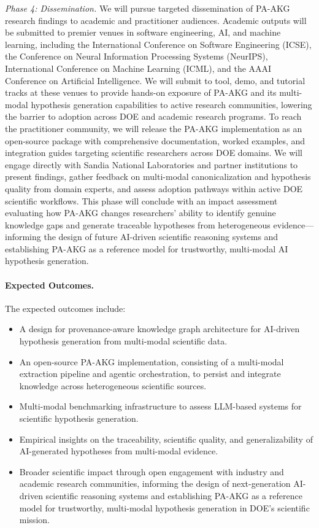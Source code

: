 \documentclass{files/proposalnsf}
\begin{document}
\textit{Phase 4: Dissemination.}
We will pursue targeted dissemination of PA-AKG research findings to academic and practitioner audiences. Academic outputs will be submitted to premier venues in software engineering, AI, and machine learning, including the International Conference on Software Engineering (ICSE), the Conference on Neural Information Processing Systems (NeurIPS), International Conference on Machine Learning (ICML), and the AAAI Conference on Artificial Intelligence. We will submit to tool, demo, and tutorial tracks at these venues to provide hands-on exposure of PA-AKG and its multi-modal hypothesis generation capabilities to active research communities, lowering the barrier to adoption across DOE and academic research programs. To reach the practitioner community, we will release the PA-AKG implementation as an open-source package with comprehensive documentation, worked examples, and integration guides targeting scientific researchers across DOE domains. We will engage directly with Sandia National Laboratories and partner institutions to present findings, gather feedback on multi-modal canonicalization and hypothesis quality from domain experts, and assess adoption pathways within active DOE scientific workflows. This phase will conclude with an impact assessment evaluating how PA-AKG changes researchers' ability to identify genuine knowledge gaps and generate traceable hypotheses from heterogeneous evidence---informing the design of future AI-driven scientific reasoning systems and establishing PA-AKG as a reference model for trustworthy, multi-modal AI hypothesis generation.

\paragraph{Expected Outcomes.} The expected outcomes include:
\begin{itemize}
    \item A design for provenance-aware knowledge graph architecture for AI-driven hypothesis generation from multi-modal scientific data.
    \item An open-source PA-AKG implementation, consisting of a multi-modal extraction pipeline and agentic orchestration, to persist and integrate knowledge across heterogeneous scientific sources.
    \item Multi-modal benchmarking infrastructure to assess LLM-based systems for scientific hypothesis generation.
    \item Empirical insights on the traceability, scientific quality, and generalizability of AI-generated hypotheses from multi-modal evidence.
    \item Broader scientific impact through open engagement with industry and academic research communities, informing the design of next-generation AI-driven scientific reasoning systems and establishing PA-AKG as a reference model for trustworthy, multi-modal hypothesis generation in DOE's scientific mission.
\end{itemize}
\end{document}
